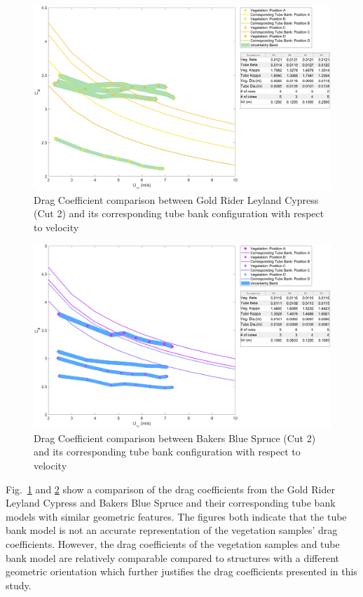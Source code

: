 \documentclass[12pt]{article}
\begin{document}
\begin{figure}[!]
	\centering 	
\includegraphics[width=\textwidth,keepaspectratio]{Picture13.pdf}
	\caption{Drag Coefficient comparison between Gold Rider Leyland Cypress (Cut 2) and its corresponding tube bank configuration with respect to velocity}
	\label{fig:TBGR}
\end{figure}

\begin{figure}[!]
	\centering 	
\includegraphics[width=\textwidth,keepaspectratio]{Picture14.pdf}
	\caption{Drag Coefficient comparison between Bakers Blue Spruce (Cut 2) and its corresponding tube bank configuration with respect to velocity}
	\label{fig:TBBB}
\end{figure}

Fig.~\ref{fig:TBGR} and \ref{fig:TBBB} show a comparison of the drag coefficients from the Gold Rider Leyland Cypress  and Bakers Blue Spruce and their corresponding tube bank models with similar geometric features. The figures both indicate that the tube bank model is not an accurate representation of the vegetation samples' drag coefficients. However, the drag coefficients of the vegetation samples and tube bank model are relatively comparable compared to structures with a different geometric orientation which further justifies the drag coefficients presented in this study. 
\end{document}
